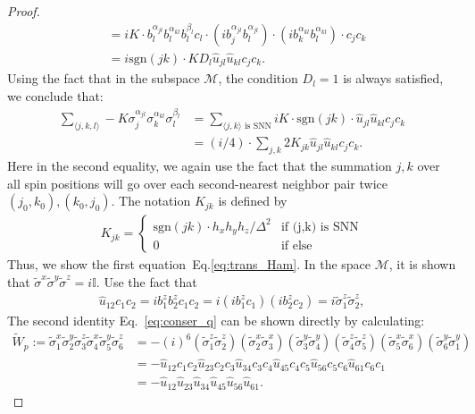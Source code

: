 \begin{proof}
\begin{align}
        &=iK \cdot b_l^{\alpha_{jl}}b_l^{\alpha_{kl}}b_l^{\beta_l}c_l\cdot (ib_j^{\alpha_{jl}}b_l^{\alpha_{jl}}) \cdot (ib_k^{\alpha_{kl}} b_l^{\alpha_{kl}}) \cdot c_jc_k\\
        &=i\text{sgn}(jk) \cdot KD_l \hat u_{jl}\hat u_{kl} c_jc_k.
    \end{align}
    Using the fact that in the subspace $\mathcal{M}$, the condition $D_l = 1$ is always satisfied, we conclude that:
    \begin{align}
        \sum_{\langle j,k,l \rangle}-K \sigma^{\alpha_{jl}}_j \sigma^{\alpha_{kl}}_k\sigma^{\beta_l}_l &=  \sum_{\langle j,k\rangle \text{~is SNN}}iK\cdot \text{sgn}(jk) \cdot \hat u_{jl}\hat u_{kl} c_jc_k\\
        &=(i/4) \cdot \sum_{j,k} 2K_{jk}\hat  u_{jl}\hat u_{kl} c_jc_k .
    \end{align}
    Here in the second equality, we again use the fact that the summation $j,k$ over all spin positions will go over each second-nearest neighbor pair twice $(j_0,k_0), (k_0,j_0)$. The notation $K_{jk}$ is defined by
    \begin{align}
        K_{jk} = \begin{cases}\text{sgn}(jk)\cdot h_x h_yh_z/\Delta^2 &\text{if (j,k) is SNN}\\0 &\text{if else}\end{cases}
    \end{align}
    Thus, we show the first equation~Eq.\eqref{eq:trans_Ham}. 
    In the space $\mathcal{M}$, it is shown that $\tilde \sigma^{x} \tilde \sigma^y \tilde \sigma^z = i \mathbb{I}$.  Use the fact that 
    \begin{align}
        \hat u_{12}c_1c_2 =ib_1^z b_2^zc_1c_2 =i (ib_1^zc_1)(ib_2^zc_2) = i\tilde \sigma_1^z \tilde \sigma_2^z ,
    \end{align} 
    The second identity Eq.~\ref{eq:conser_q} can be shown directly by calculating:
    \begin{align}
        \tilde W_p := \tilde\sigma_1^x\tilde \sigma_2^y \tilde\sigma_3^z \tilde\sigma_4^x\tilde\sigma_5^y \tilde\sigma_6^z &=-(i)^6(\tilde\sigma_1^z\tilde\sigma_2^z)(\tilde\sigma_2^x\tilde\sigma_3^x)(\tilde\sigma_3^y\tilde\sigma_4^y)(\tilde\sigma_4^z\tilde\sigma_5^z)(\tilde\sigma_5^x\tilde\sigma_6^x)(\tilde\sigma_6^y\tilde\sigma_1^y)\\
         &= -\hat u_{12}c_1c_2 \hat u_{23}c_2c_3 \hat u_{34}c_3c_4 \hat u_{45}c_4c_5 \hat u_{56}c_5c_6 \hat u_{61}c_6c_1\\
         &=-\hat{u}_{12}\hat{u}_{23}\hat{u}_{34}\hat{u}_{45}\hat{u}_{56}\hat{u}_{61}.
    \end{align}
\end{proof}
